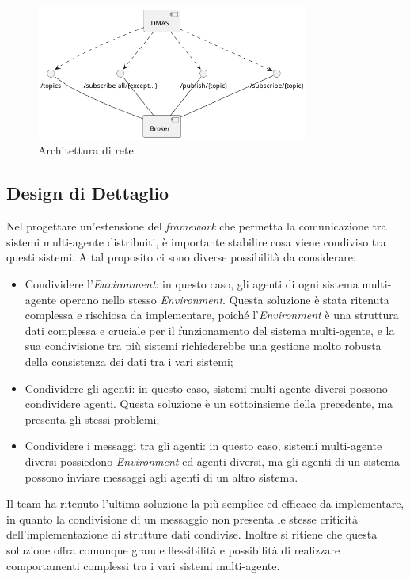 \begin{figure}[ht!]
    \centering
    \includegraphics[width=0.8\textwidth]{figures/network-architecture.png}
    \caption{Architettura di rete}
    \label{fig:network-architecture}
\end{figure}

\subsection{Design di Dettaglio}
Nel progettare un'estensione del \textit{framework} che permetta la comunicazione tra sistemi multi-agente distribuiti, è importante stabilire cosa viene condiviso tra questi sistemi.
A tal proposito ci sono diverse possibilità da considerare:
\begin{itemize}
    \item Condividere l'\textit{Environment}: in questo caso, gli agenti di ogni sistema multi-agente operano nello stesso \textit{Environment}. Questa soluzione è stata ritenuta complessa e rischiosa da implementare,
    poiché l'\textit{Environment} è una struttura dati complessa e cruciale per il funzionamento del sistema multi-agente, e la sua condivisione tra più sistemi richiederebbe una gestione molto robusta della consistenza dei dati tra i vari sistemi;
    \item Condividere gli agenti: in questo caso, sistemi multi-agente diversi possono condividere agenti. Questa soluzione è un sottoinsieme della precedente, ma presenta gli stessi problemi;
    \item Condividere i messaggi tra gli agenti: in questo caso, sistemi multi-agente diversi possiedono \textit{Environment} ed agenti diversi, ma gli agenti di un sistema possono inviare messaggi agli agenti di un altro sistema.
\end{itemize}

Il team ha ritenuto l'ultima soluzione la più semplice ed efficace da implementare, in quanto la condivisione di un messaggio non presenta le stesse criticità dell'implementazione di strutture dati condivise. Inoltre si ritiene che questa soluzione offra comunque grande flessibilità e possibilità di realizzare comportamenti complessi tra i vari sistemi multi-agente.

